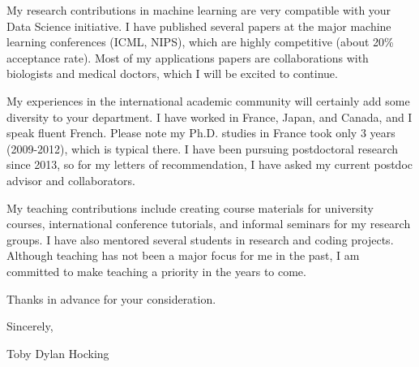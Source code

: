 \documentclass{article}
\begin{document}
My research contributions in machine learning are very compatible with
your Data Science initiative. 
I
have published several papers at the major machine learning
conferences (ICML, NIPS), which are highly competitive (about 20\%
acceptance rate).
Most of my applications papers are collaborations with biologists and
medical doctors, which I will be excited to continue. 


My experiences in the international academic community will certainly
add some diversity to your department. I have worked in France, Japan,
and Canada, and I speak fluent French. Please note my Ph.D. studies in
France took only 3 years (2009-2012), which is typical there.
I have been
pursuing postdoctoral research since 2013, so for my letters of
recommendation, I have asked my current postdoc advisor and
collaborators.

My teaching contributions include creating course materials for
university courses, international conference tutorials, and informal
seminars for my research groups. I have also mentored several students
in research and coding projects. Although teaching has not been a
major focus for me in the past, I am committed to make teaching a
priority in the years to come.



Thanks in advance for your consideration.

Sincerely,


Toby Dylan Hocking
\end{document}
